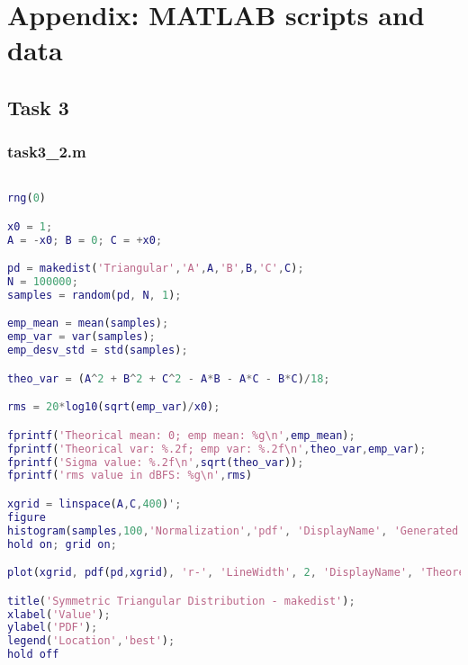 \appendix
\section{Appendix: MATLAB scripts and data}
\label{app:matlab}

\subsection{Task 3}
\subsubsection{task3\_2.m}

\begin{lstlisting}[language=Matlab]

rng(0)

x0 = 1;
A = -x0; B = 0; C = +x0;

pd = makedist('Triangular','A',A,'B',B,'C',C);
N = 100000;
samples = random(pd, N, 1);

emp_mean = mean(samples);
emp_var = var(samples);
emp_desv_std = std(samples);

theo_var = (A^2 + B^2 + C^2 - A*B - A*C - B*C)/18;

rms = 20*log10(sqrt(emp_var)/x0);

fprintf('Theorical mean: 0; emp mean: %g\n',emp_mean);
fprintf('Theorical var: %.2f; emp var: %.2f\n',theo_var,emp_var);
fprintf('Sigma value: %.2f\n',sqrt(theo_var));
fprintf('rms value in dBFS: %g\n',rms)

xgrid = linspace(A,C,400)';
figure
histogram(samples,100,'Normalization','pdf', 'DisplayName', 'Generated samples')
hold on; grid on;

plot(xgrid, pdf(pd,xgrid), 'r-', 'LineWidth', 2, 'DisplayName', 'Theoretical PDF');

title('Symmetric Triangular Distribution - makedist');
xlabel('Value');
ylabel('PDF');
legend('Location','best');
hold off
\end{lstlisting}

